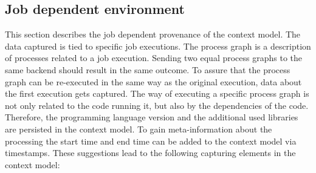 \documentclass[draft,final]{vutinfth} %
\begin{document}
\subsection{Job dependent environment}\label{Design:Job dependent provenance}\label{Job:Backend provenance}\label{Job:Process Data}
This section describes the job dependent provenance of the context model. The data captured is tied to specific job executions. The process graph is a description of processes related to a job execution. Sending two equal process graphs to the same backend should result in the same outcome. To assure that the process graph can be re-executed in the same way as the original execution, data about the first execution gets captured. The way of executing a specific process graph is not only related to the code running it, but also by the dependencies of the code. Therefore, the programming language version and the additional used libraries are persisted in the context model. To gain meta-information about the processing the start time and end time can be added to the context model via timestamps. These suggestions lead to the following capturing elements in the context model: 
 





\end{document}
